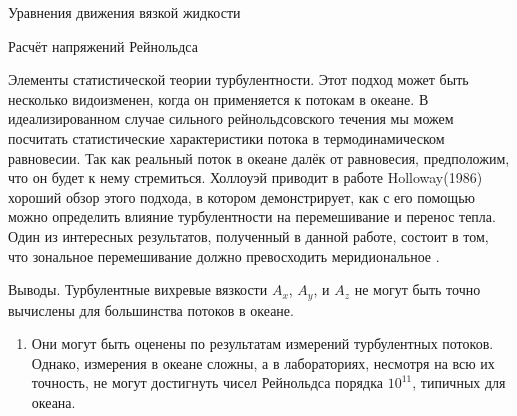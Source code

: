 \begin{chapter}{Уравнения движения вязкой жидкости}
\begin{section}{Расчёт напряжений Рейнольдса}
\begin{paragraph}{Элементы статистической теории турбулентности.}
Этот подход может быть несколько видоизменен, когда он применяется к потокам 
в океане. В идеализированном случае сильного рейнольдсовского течения мы
можем посчитать статистические характеристики потока в
термодинамическом равновесии. Так как реальный поток в океане далёк от
равновесия, предположим, что он будет к нему стремиться. 
Холлоуэй приводит в работе Holloway(1986) хороший обзор этого подхода,
в котором демонстрирует, как с его помощью можно определить влияние
турбулентности на перемешивание
и перенос тепла. Один из интересных результатов,
полученный в данной работе, состоит в том, что зональное перемешивание%
 должно превосходить меридиональное%
.
%
\end{paragraph}

\begin{paragraph}{Выводы.}
Турбулентные вихревые вязкости $A_x$, $A_y$, и $A_z$ не могут быть точно
вычислены для большинства потоков в океане.
%

\begin{enumerate}
\item
Они могут быть оценены по результатам измерений турбулентных потоков. 
Однако, измерения в океане сложны, а в лабораториях, несмотря на всю 
их точность, не могут достигнуть чисел Рейнольдса порядка $10^{11}$, 
типичных для океана.
%


\end{enumerate}
\end{paragraph}
\end{section}
\end{chapter}
